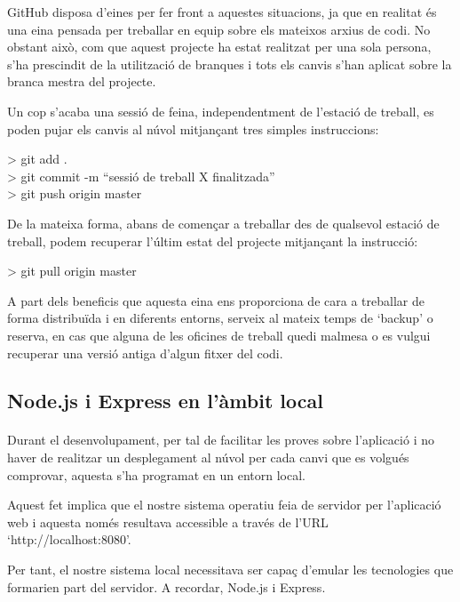     GitHub disposa d'eines per fer front a aquestes situacions, ja que en realitat és una eina pensada per treballar en equip sobre els mateixos arxius de codi. No obstant això, com que aquest projecte ha estat realitzat per una sola persona, s'ha prescindit de la utilització de branques i tots els canvis s'han aplicat sobre la branca mestra del projecte.

    Un cop s'acaba una sessió de feina, independentment de l'estació de treball, es poden pujar els canvis al núvol mitjançant tres simples instruccions:

    \begin{displayquote}
        > git add .\\
        > git commit -m ``sessió de treball X finalitzada''\\
        > git push origin master
    \end{displayquote}

    De la mateixa forma, abans de començar a treballar des de qualsevol estació de treball, podem recuperar l'últim estat del projecte mitjançant la instrucció:

    \begin{displayquote}
        > git pull origin master
    \end{displayquote}

    A part dels beneficis que aquesta eina ens proporciona de cara a treballar de forma distribuïda i en diferents entorns, serveix al mateix temps de `backup' o reserva, en cas que alguna de les oficines de treball quedi malmesa o es vulgui recuperar una versió antiga d'algun fitxer del codi.


    \subsection{Node.js i Express en l'àmbit local}

    \paragraph{}
    Durant el desenvolupament, per tal de facilitar les proves sobre l’aplicació i no haver de realitzar un desplegament al núvol per cada canvi que es volgués comprovar, aquesta s'ha programat en un entorn local.

    Aquest fet implica que el nostre sistema operatiu feia de servidor per l'aplicació web i aquesta només resultava accessible a través de l'URL `http://localhost:8080'.

    Per tant, el nostre sistema local necessitava ser capaç d'emular les tecnologies que formarien part del servidor. A recordar, Node.js i Express.

